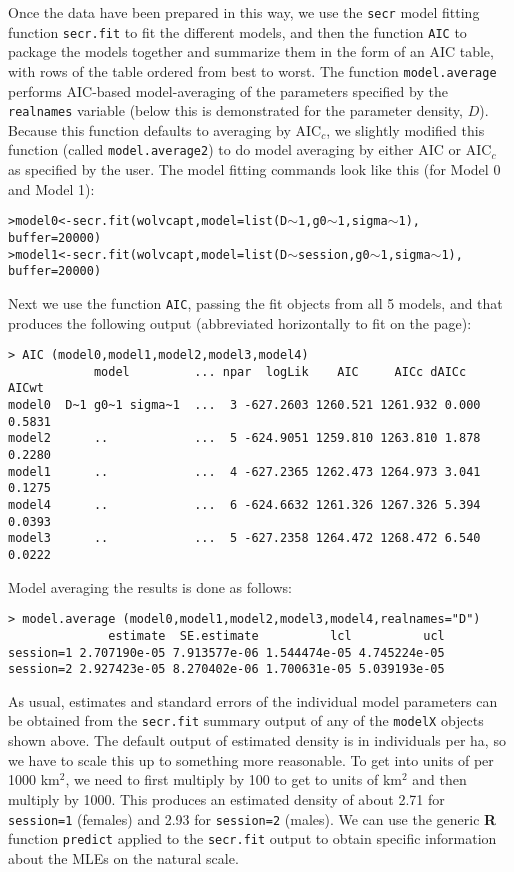 Once the data have been prepared in this way, we use the
\mbox{\tt secr} model fitting function \mbox{\tt secr.fit} to fit the
different models, and then the function \mbox{\tt AIC} to
package the models together and summarize them in the form of an AIC
table, with rows of the table ordered from best to worst. The function
\mbox{\tt model.average} performs AIC-based model-averaging of the
parameters specified by the \mbox{\tt realnames} variable (below this
is demonstrated for the parameter density, $D$).  Because this
function defaults to averaging by AIC$_c$, we slightly modified
this function (called \mbox{\tt model.average2}) to do model averaging
by either  AIC or AIC$_c$ as specified by the user. The model fitting
commands look like this (for Model 0 and Model 1):
{\small
\begin{alltt}
> model0 <- secr.fit(wolvcapt, model=list(D\(\sim\)1, g0\(\sim\)1, sigma\(\sim\)1), 
                  buffer=20000)
> model1 <- secr.fit(wolvcapt, model=list(D\(\sim\)session, g0\(\sim\)1, sigma\(\sim\)1), 
                  buffer=20000)
\end{alltt}
}
Next we use the function \mbox{\tt AIC}, passing the fit objects from
all 5 models, and that produces the following output (abbreviated
horizontally to fit on the page):
{\small
\begin{verbatim}
> AIC (model0,model1,model2,model3,model4)
            model         ... npar  logLik    AIC     AICc dAICc  AICwt
model0  D~1 g0~1 sigma~1  ...  3 -627.2603 1260.521 1261.932 0.000 0.5831
model2      ..            ...  5 -624.9051 1259.810 1263.810 1.878 0.2280
model1      ..            ...  4 -627.2365 1262.473 1264.973 3.041 0.1275
model4      ..            ...  6 -624.6632 1261.326 1267.326 5.394 0.0393
model3      ..            ...  5 -627.2358 1264.472 1268.472 6.540 0.0222
\end{verbatim}
}
Model averaging the results is done as follows:
{\small 
\begin{verbatim}
> model.average (model0,model1,model2,model3,model4,realnames="D")
              estimate  SE.estimate          lcl          ucl
session=1 2.707190e-05 7.913577e-06 1.544474e-05 4.745224e-05
session=2 2.927423e-05 8.270402e-06 1.700631e-05 5.039193e-05
\end{verbatim}
}
As usual, estimates and standard errors of the individual model
parameters can be obtained from the \mbox{\tt secr.fit} summary output
of any of the \mbox{\tt modelX} objects shown above.
The default output of estimated density is in individuals per ha, so
we have to scale this up to something more reasonable. To get into
units of per 1000 km$^2$, we need to first multiply by 100 to get to units of
km$^2$ and then multiply by 1000. This produces an estimated density of
about 2.71 for \mbox{\tt session=1} (females) and 2.93 for
\mbox{\tt session=2} (males).  We can use the generic {\bf R} function
\mbox{\tt predict} applied to the \mbox{\tt secr.fit} output to obtain
 specific information about the MLEs on the natural scale.

